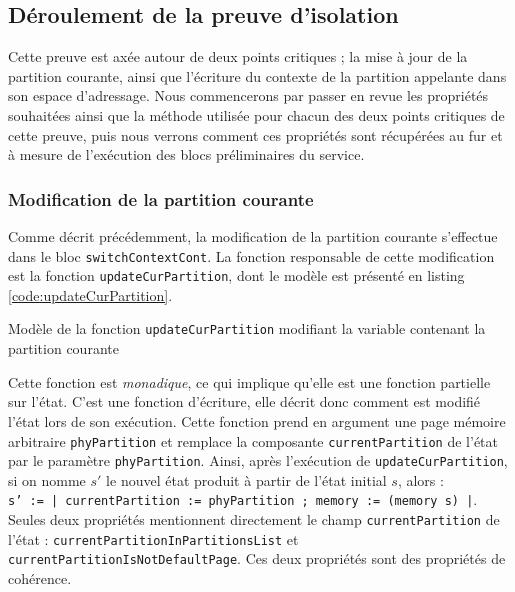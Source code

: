 		\subsection{Déroulement de la preuve d'isolation}

		Cette preuve est axée autour de deux points critiques ; la mise à jour de la partition courante, ainsi que l'écriture du contexte de la partition appelante dans son espace d'adressage. Nous commencerons par passer en revue les propriétés souhaitées ainsi que la méthode utilisée pour chacun des deux points critiques de cette preuve, puis nous verrons comment ces propriétés sont récupérées au fur et à mesure de l'exécution des blocs préliminaires du service.

			\subsubsection{Modification de la partition courante}
			\label{sec:curPartModif}

			Comme décrit précédemment, la modification de la partition courante s'effectue dans le bloc \texttt{switchContextCont}. La fonction responsable de cette modification est la fonction \texttt{updateCurPartition}, dont le modèle est présenté en listing \ref{code:updateCurPartition}.

			\begin{listing}[!ht]
				\caption{Modèle de la fonction \texttt{updateCurPartition} modifiant la variable contenant la partition courante}
				\label{code:updateCurPartition}
			\end{listing}

			Cette fonction est \emph{monadique}, ce qui implique qu'elle est une fonction partielle sur l'état. C'est une fonction d'écriture, elle décrit donc comment est modifié l'état lors de son exécution. Cette fonction prend en argument une page mémoire arbitraire \texttt{phyPartition} et remplace la composante \texttt{currentPartition} de l'état par le paramètre \texttt{phyPartition}. Ainsi, après l'exécution de \texttt{updateCurPartition}, si on nomme $s'$ le nouvel état produit à partir de l'état initial $s$, alors : \\

			\texttt{s' := {| currentPartition := phyPartition ; memory := (memory s) |}}.\\

			Seules deux propriétés mentionnent directement le champ \texttt{currentPartition} de l'état : \texttt{currentPartitionInPartitionsList} et \texttt{currentPartitionIsNotDefaultPage}. Ces deux propriétés sont des propriétés de cohérence.

